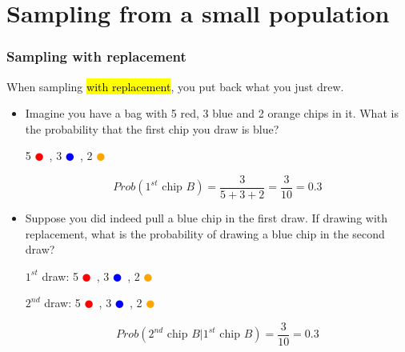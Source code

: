 
\section{Sampling from a small population}


\begin{frame}
\frametitle{Sampling with replacement}

When sampling \hl{with replacement}, you put back what you just drew.

\pause

\begin{itemize}

\item Imagine you have a bag with 5 red, 3 blue and 2 orange chips in it. What is the probability that the first chip you draw is blue?
\begin{center}
5 \textcolor{red}{$\CIRCLE$}~, 3 \textcolor{blue}{$\CIRCLE$}~, 2 \textcolor{orange}{$\CIRCLE$}
\end{center}

\pause

\[ Prob(1^{st} \text{ chip } B) = \frac{3}{5 + 3 + 2} = \frac{3}{10} = 0.3 \]

\pause

\item Suppose you did indeed pull a blue chip in the first draw. If drawing with replacement, what is the probability of drawing a blue chip in the second draw?

\pause

\begin{center}
$1^{st}$ draw: 5 \textcolor{red}{$\CIRCLE$}~, 3 \textcolor{blue}{$\CIRCLE$}~, 2 \textcolor{orange}{$\CIRCLE$} \\

\pause

$2^{nd}$ draw: 5 \textcolor{red}{$\CIRCLE$}~, 3 \textcolor{blue}{$\CIRCLE$}~, 2 \textcolor{orange}{$\CIRCLE$}
\end{center}

\pause

\[ Prob(2^{nd} \text{ chip } B | 1^{st} \text{ chip } B) = \frac{3}{10} = 0.3 \]

\end{itemize}

\end{frame}


